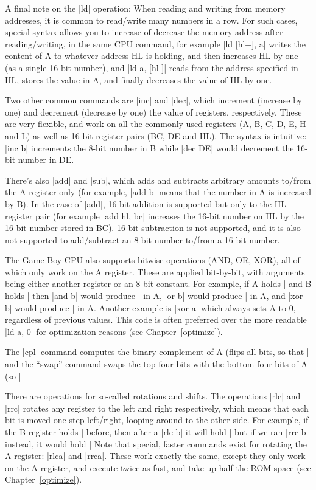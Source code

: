 \documentclass[11pt]{book}
\begin{document}
A final note on the |ld| operation: When reading and writing from memory addresses, it is common to read/write many numbers in a row. For such cases, special syntax allows you to increase of decrease the memory address after reading/writing, in the same CPU command, for example |ld [hl+], a| writes the content of A to whatever address HL is holding, and then increases HL by one (as a single 16-bit number), and |ld a, [hl-]| reads from the address specified in HL, stores the value in A, and finally decreases the value of HL by one. 

Two other common commands are |inc| and |dec|, which increment (increase by one) and decrement (decrease by one) the value of registers, respectively. These are very flexible, and work on all the commonly used registers (A, B, C, D, E, H and L) as well as 16-bit register pairs (BC, DE and HL). The syntax is intuitive: |inc b| increments the 8-bit number in B while |dec DE| would decrement the 16-bit number in DE.

There’s also |add| and |sub|, which adds and subtracts arbitrary amounts to/from the A register only (for example, |add b| means that the number in A is increased by B). In the case of |add|, 16-bit addition is supported but only to the HL register pair (for example |add hl, bc| increases the 16-bit number on HL by the 16-bit number stored in BC). 16-bit subtraction is not supported, and it is also not supported to add/subtract an 8-bit number to/from a 16-bit number. 

The Game Boy CPU also supports bitwise operations (AND, OR, XOR), all of which only work on the A register. These are applied bit-by-bit, with arguments being either another register or an 8-bit constant. For example, if A holds |%
 and B holds |%
 then |and b| would produce |%
 in A, |or b| would produce |%
 in A, and |xor b| would produce |%
 in A. Another example is |xor a| which always sets A to 0, regardless of previous values. This code is often preferred over the more readable |ld a, 0| for optimization reasons (see Chapter~\ref{optimize}).

The |cpl| command computes the binary complement of A (flips all bits, so that |%
and the “swap” command swaps the top four bits with the bottom four bits of A (so |%

There are operations for so-called rotations and shifts. The operations |rlc| and |rrc| rotates any register to the left and right respectively, which means that each bit is moved one step left/right, looping around to the other side. For example, if the B register holds |%
before, then after a |rlc b| it will hold |%
but if we ran |rrc b| instead, it would hold |%
Note that special, faster commands exist for rotating the A register: |rlca| and |rrca|. These work exactly the same, except they only work on the A register, and execute twice as fast, and take up half the ROM space (see Chapter~\ref{optimize}). 
\end{document}
